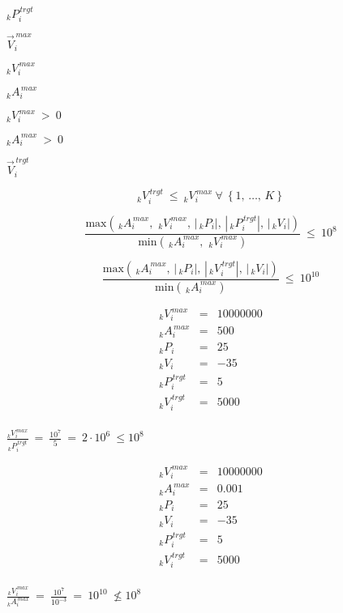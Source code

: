 \documentclass{article}
\begin{document}
$ _kP_i^{\,trgt} $
\pagebreak

$ \vec{V}_i^{\,max} $
\pagebreak

$ _kV_i^{\,max} $
\pagebreak

$ _kA_i^{\,max} $
\pagebreak

$ _kV_i^{\,max} \ > \ 0 $
\pagebreak

$ _kA_i^{\,max} \ > \ 0 $
\pagebreak

$ \vec{V}_i^{\,trgt} $
\pagebreak

\[ _kV_i^{\,trgt}\ \le \ _kV_i^{\,max}\ \forall\ \left\{1,\,\dots,\,K\right\} \]
\pagebreak

\[ \frac{\displaystyle \mbox{max}\left( \,\!_kA_i^{\,max}, \, \,\!_kV_i^{\,max}, \, \left|\,\!_kP_i\right|, \, \left|\,\!_kP_i^{\,trgt}\right|, \, \left|\,\!_kV_i\right| \right)}{\displaystyle \mbox{min}\left(\,\!_kA_i^{\,max}, \, \,\!_kV_i^{\,max} \right)} \ \le\ 10^8 \]
\pagebreak

\[ \frac{\displaystyle \mbox{max}\left( \,\!_kA_i^{\,max}, \, \left|\,\!_kP_i\right|, \, \left|\,\!_kV_i^{\,trgt}\right|, \, \left|\,\!_kV_i\right| \right)}{\displaystyle \mbox{min}\left(\,\!_kA_i^{\,max} \right)} \ \le\ 10^{10} \]
\pagebreak

\[ \begin{array}{rcl} _kV_i^{\,max}&=&10000000\\[2ex] _kA_i^{\,max}&=&500\\[2ex] _kP_i&=&25\\[2ex] _kV_i&=&-35\\[2ex] _kP_i^{\,trgt}&=&5\\[2ex] _kV_i^{\,trgt}&=&5000\\[2ex] \end{array} \]
\pagebreak

$ \frac{\displaystyle _kV_i^{\,max}}{\displaystyle _kP_i^{\,trgt}} \ =\ \frac{\displaystyle 10^7}{\displaystyle 5}\ =\ 2\cdot10^6\ \le 10^8 $
\pagebreak

\[ \begin{array}{rcl} _kV_i^{\,max}&=&10000000\\[2ex] _kA_i^{\,max}&=&0.001\\[2ex] _kP_i&=&25\\[2ex] _kV_i&=&-35\\[2ex] _kP_i^{\,trgt}&=&5\\[2ex] _kV_i^{\,trgt}&=&5000\\[2ex] \end{array} \]
\pagebreak

$ \frac{\displaystyle _kV_i^{\,max}}{\displaystyle _kA_i^{\,max}} \ =\ \frac{\displaystyle 10^7}{\displaystyle 10^{-3}}\ =\ 10^{10}\ \not\leq 10^8 $
\pagebreak
\end{document}
